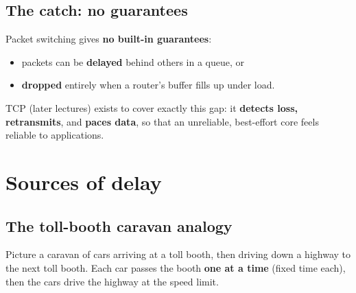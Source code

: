 \begin{center}
\end{center}

\subsection{The catch: no guarantees}
Packet switching gives \textbf{no built-in guarantees}:
\begin{itemize}
  \item packets can be \textbf{delayed} behind others in a queue, or
  \item \textbf{dropped} entirely when a router's buffer fills up under load.
\end{itemize}

\begin{keyidea}
TCP (later lectures) exists to cover exactly this gap: it \textbf{detects loss, retransmits}, and \textbf{paces data}, so that an unreliable, best-effort core feels reliable to applications.
\end{keyidea}

\section{Sources of delay}

\subsection{The toll-booth caravan analogy}
Picture a caravan of cars arriving at a toll booth, then driving down a highway to the next toll booth. Each car passes the booth \textbf{one at a time} (fixed time each), then the cars drive the highway at the speed limit.


